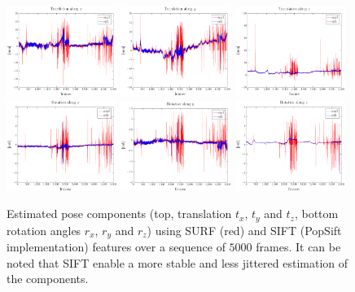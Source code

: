 \begin{figure}
  \centering
  \includegraphics[width=0.32\textwidth]{./figs/translationX.pdf}
  \includegraphics[width=0.32\textwidth]{./figs/translationY.pdf}
  \includegraphics[width=0.32\textwidth]{./figs/translationZ.pdf}
  \includegraphics[width=0.32\textwidth]{./figs/rotationX.pdf}
  \includegraphics[width=0.32\textwidth]{./figs/rotationY.pdf}
  \includegraphics[width=0.32\textwidth]{./figs/rotationZ.pdf}
\caption{Estimated pose components (top, translation $t_x$, $t_y$ and $t_z$, bottom rotation angles $r_x$, $r_y$ and $r_z$) using SURF (red) and SIFT (PopSift implementation) features over a sequence of $5000$ frames. It can be noted that SIFT enable a more stable and less jittered estimation of the components.}
\label{fig:SurfVsSift}
\end{figure}



